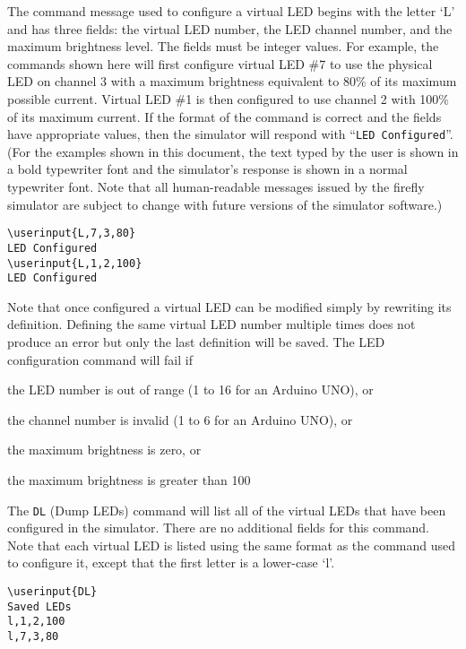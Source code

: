 \documentclass[letterpaper,11pt]{article}
\newcommand\userinput[1]{\textbf{#1}}
\begin{document}
The command message used to configure a virtual LED begins with the letter `L'
and has three fields: the virtual LED number, the LED channel number, and the
maximum brightness level. The fields must be integer values. For example, the
commands shown here will first configure virtual LED \#7 to use the physical
LED on channel 3 with a maximum brightness equivalent to 80\% of its maximum
possible current. Virtual LED \#1 is then configured to use channel 2 with
100\% of its maximum current. If the format of the command is correct and the
fields have appropriate values, then the simulator will respond with
``\texttt{LED Configured}''.  (For the examples shown in this document, the
text typed by the user is shown in a bold typewriter font and the simulator's
response is shown in a normal typewriter font. Note that all human-readable
messages issued by the firefly simulator are subject to change with future
versions of the simulator software.)

\begin{tcolorbox}
\begin{Verbatim}[commandchars=\\\{\}]
\userinput{L,7,3,80}
LED Configured
\userinput{L,1,2,100}
LED Configured
\end{Verbatim}
\end{tcolorbox}

Note that once configured a virtual LED can be modified simply by rewriting
its definition. Defining the same virtual LED number multiple times does not
produce an error but only the last definition will be saved.
The LED configuration command will fail if
\begin{compactitem}
  \item the LED number is out of range (1 to 16 for an Arduino UNO), or
  \item the channel number is invalid (1 to 6 for an Arduino UNO), or
  \item the maximum brightness is zero, or
  \item the maximum brightness is greater than 100
\end{compactitem}

The \texttt{DL} (Dump LEDs) command will list all of the virtual LEDs that
have been configured in the simulator. There are no additional fields for this
command. Note that each virtual LED is listed using the same format as the
command used to configure it, except that the first letter is a lower-case
`l'.
\begin{tcolorbox}
\begin{Verbatim}[commandchars=\\\{\}]
\userinput{DL}
Saved LEDs
l,1,2,100
l,7,3,80
\end{Verbatim}
\end{tcolorbox}
\end{document}
